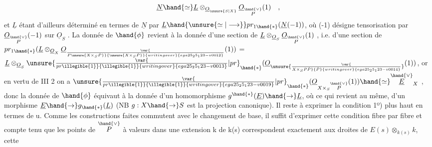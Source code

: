 \[ \underline{N}\hand{\simeq}\underline{L}\otimes_{\underline{O}_{\unsure{S|X}}}\underline{O}_{\overset{\hand{\vee}}{P}}(1) \quad , \]
et $\underline{L}$ étant d'ailleurs déterminé en termes de $\underline{N}$ par $\underline{L}\hand{\unsure{\simeq|\longrightarrow}} pr_{1\hand{*}}(\underline{N}(-1))$,
où (-1) désigne  tensorisation par $\underline{O}_{\overset{\hand{\vee}}{P}}(-1)$ sur $\underline{O}_S$ . La donnée de $\hand{\phi}$
revient à la donnée d'une section de $\underline{L}\otimes_{\underline{O}_S}\underline{O}_{\overset{\hand{\vee}}{P}}(1)$ , i.e. d'une section
de $pr_{1\hand{*}}(\underline{L}\otimes_{\underline{O}_X}\underline{O}_{\var{\over{P}{\unsure{X\times_S\check{P}}}}{\unsure{X\times_S\check{P}}}{writing over}{ega25_25_123-v0012}}(1))$ = $\underline{L}\otimes_{\underline{O}_S}\unsure{\var{\over{pr}{\illegible{1}}}{\illegible{1}}{writing over}{ega25_25_123-v0013}|pr}_{\hand{*}}(\underline{O}_{\unsure{\var{\over{X\times_S P}{\check{P}}}{\check{P}}{writing over}{ega25_25_123-v0014}}}(1))$, 
 or en vertu de III 2 on a $\unsure{\var{\over{pr}{\illegible{1}}}{\illegible{1}}{writing over}{ega25_25_123-v0019}|pr}_{\hand{*}}(\underline{O}_{X\times_S\overset{\hand{\vee}}{P}}(1))\hand{\simeq}\overset{\hand{\vee}}{\underline{E}}_X$ , donc
la donnée de $\hand{\phi}$ équivaut à  la donnée d'un homomorphisme $g^{\hand{*}}(\underline{E})\hand{\to}\underline{L}$,
où ce qui revient au même, d'un morphisme  $\underline{E}\hand{\to} g_{\hand{*}}(\underline{L})$ (NB $g:X\hand{\to} S$ est
la projection canonique). Il reste à exprimer la condition 1º) plus
haut en termes de u. Comme les constructions faites commutent avec le
changement de base, il suffit d'exprimer cette condition fibre par fibre\hand{,}
et compte tenu que les points de $\overset{\hand{\vee}}{P}$ à valeurs dans une extension k de
k(s) correspondent exactement aux droites de $E(s)\otimes_{k(s)}k$, cette

